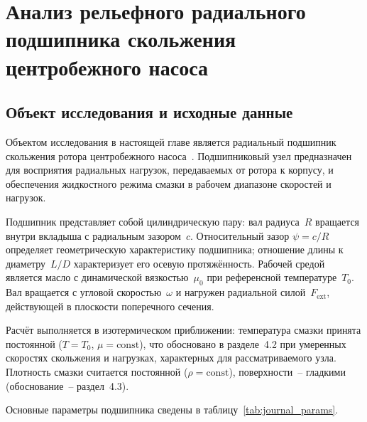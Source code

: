 \chapter{Анализ рельефного радиального подшипника скольжения центробежного насоса}

\section{Объект исследования и исходные данные}

Объектом исследования в настоящей главе является радиальный
подшипник скольжения ротора центробежного насоса~\cite{bashmur2024a}.
Подшипниковый узел предназначен для восприятия радиальных
нагрузок, передаваемых от ротора к корпусу, и обеспечения
жидкостного режима смазки в рабочем диапазоне скоростей
и нагрузок.

Подшипник представляет собой цилиндрическую пару: вал
радиуса~$R$ вращается внутри вкладыша с радиальным зазором~$c$.
Относительный зазор $\psi = c/R$ определяет геометрическую
характеристику подшипника; отношение длины к диаметру~$L/D$
характеризует его осевую протяжённость. Рабочей средой является
масло с динамической вязкостью~$\mu_0$ при референсной
температуре~$T_0$. Вал вращается с угловой скоростью~$\omega$
и нагружен радиальной силой~$F_{\mathrm{ext}}$, действующей
в плоскости поперечного сечения.

Расчёт выполняется в изотермическом приближении: температура
смазки принята постоянной ($T = T_0$, $\mu = \mathrm{const}$),
что обосновано в разделе~4.2 при умеренных скоростях скольжения
и нагрузках, характерных для рассматриваемого узла. Плотность
смазки считается постоянной ($\rho = \mathrm{const}$),
поверхности~-- гладкими (обоснование~-- раздел~4.3).

Основные параметры подшипника сведены в таблицу~\ref{tab:journal_params}.

